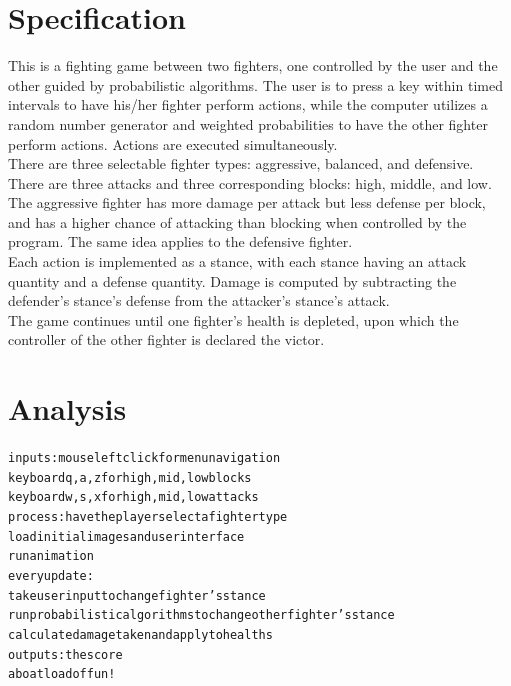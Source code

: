 \documentclass{article}
\begin{document}
\section*{Specification}
This is a fighting game between two fighters, one controlled by the user and the other guided by probabilistic algorithms. The user is to press a key within timed intervals to have his/her fighter perform actions, while the computer utilizes a random number generator and weighted probabilities to have the other fighter perform actions. Actions are executed simultaneously.\\
There are three selectable fighter types: aggressive, balanced, and defensive. There are three attacks and three corresponding blocks: high, middle, and low. The aggressive fighter has more damage per attack but less defense per block, and has a higher chance of attacking than blocking when controlled by the program. The same idea applies to the defensive fighter.\\
Each action is implemented as a stance, with each stance having an attack quantity and a defense quantity. Damage is computed by subtracting the defender's stance's defense from the attacker's stance's attack.\\
The game continues until one fighter's health is depleted, upon which the controller of the other fighter is declared the victor.
\clearpage
\section*{Analysis}
\begin{alltt}
inputs:  mouse left click for menu navigation
         keyboard q, a, z for high, mid, low blocks
         keyboard w, s, x for high, mid, low attacks
process: have the player select a fighter type
         load initial images and user interface
         run animation
         every update:
             take user input to change fighter's stance
             run probabilistic algorithms to change other fighter's stance
             calculate damage taken and apply to healths
outputs: the score
         a boatload of fun!
\end{alltt}
\clearpage
\end{document}
